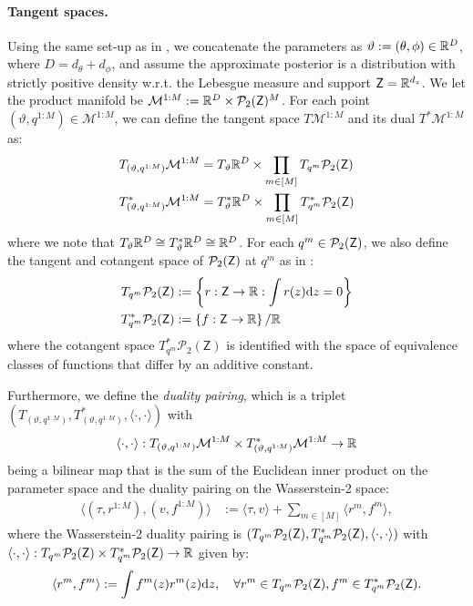 \paragraph{Tangent spaces.} Using the same set-up as in \citet{kuntz23a}, we concatenate the parameters as $\vartheta:=(\theta,\phi)\in \mathbb{R}^D$, where $D=d_\theta+d_\phi$, and assume the approximate posterior is a distribution with strictly positive density w.r.t. the Lebesgue measure and support ${\mathsf{Z}}=\mathbb{R}^{d_z}$. We let the product manifold be $\mathcal{M}^{1:M}:=\mathbb{R}^D \times \mathcal{P}_2({\mathsf{Z}})^M$. For each point $(\vartheta, q^{1:M}) \in \mathcal{M}^{1:M}$, we can define the tangent space $T\mathcal{M}^{1:M}$ and its dual $T^*\mathcal{M}^{1:M}$ as:
\begin{align*}
    T_{(\vartheta, q^{1:M})}\mathcal{M}^{1:M} &= T_\vartheta\mathbb{R}^D \times \prod_{m\in[M]} T_{q^{m}}\mathcal{P}_2(\mathsf{Z})\\
    T_{(\vartheta, q^{1:M})}^*\mathcal{M}^{1:M} &= T_\vartheta^*\mathbb{R}^D \times \prod_{m\in[M]} T_{q^{m}}^*\mathcal{P}_2(\mathsf{Z})
\end{align*}
where we note that $T_\vartheta \mathbb{R}^D \cong T_\vartheta^* \mathbb{R}^D \cong \mathbb{R}^{D}$. For each $q^m \in \mathcal{P}_2({\mathsf{Z}})$, we also define the tangent and cotangent space of $\mathcal{P}_2({\mathsf{Z}})$ at $q^m$ as in \citet{otto31012001}:
\begin{align*}
    T_{q^m}\mathcal{P}_2(\mathsf{Z}) &:= \left\{
    r:\mathsf{Z} \to \mathbb{R}: \int r(z) {\mathrm{d}} z=0
    \right\} \\
    T_{q^m}^* \mathcal{P}_2(\mathsf{Z}) &:= \left\{
    f: {\mathsf{Z}} \to \mathbb{R}
    \right\} / \mathbb{R}
\end{align*}
where the cotangent space $T_{q^m}^*\mathcal{P}_2(\mathsf{Z})$ is identified with the space of equivalence classes of functions that differ by an additive constant. 


Furthermore, we define the \textit{duality pairing}, which is a triplet $(T_{(\vartheta, q^{1:M})}, T_{(\vartheta, q^{1:M})}^*, \langle\cdot,\cdot\rangle)$ with $$\langle\cdot,\cdot\rangle: T_{(\vartheta, q^{1:M})}\mathcal{M}^{1:M} \times T_{(\vartheta, q^{1:M})}^*\mathcal{M}^{1:M} \to \mathbb{R}$$ being a bilinear map that is the sum of the Euclidean inner product on the parameter space and the duality pairing on the Wasserstein-2 space:
\begin{align*}
    \langle (\tau, r^{1:M}), (v, f^{1:M}) \rangle &:= \langle \tau, v \rangle + \sum_{m\in[M]} \langle r^m, f^m \rangle,
\end{align*}
where the Wasserstein-2 duality pairing is $(T_{q^m}\mathcal{P}_2({\mathsf{Z}}),T_{q^m}^*\mathcal{P}_2({\mathsf{Z}}), \langle\cdot,\cdot\rangle)$ with $\langle\cdot,\cdot\rangle: T_{q^m}\mathcal{P}_2({\mathsf{Z}}) \times T_{q^m}^*\mathcal{P}_2({\mathsf{Z}}) \to \mathbb{R}$ given by:
\begin{equation}
    \langle r^m,f^m\rangle:=\int f^m(z)r^m(z) {\mathrm{d}} z, \quad \forall r^m \in T_{q^m}\mathcal{P}_2({\mathsf{Z}}), f^m\in T_{q^m}^*\mathcal{P}_2({\mathsf{Z}}).
\end{equation}

